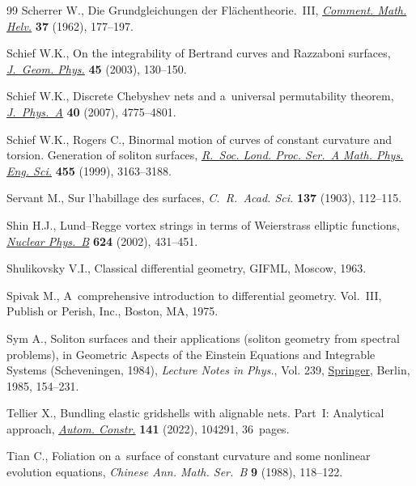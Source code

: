 \documentclass[pdftex]{sigma}
\numberwithin{equation}{section}
\begin{document}
\begin{thebibliography}{99}
Scherrer W., Die {G}rundgleichungen der {F}l\"achentheorie.~{III},
  \href{https://doi.org/10.1007/BF02566971}{\textit{Comment. Math. Helv.}} \textbf{37} (1962), 177--197.

Schief W.K., On the integrability of {B}ertrand curves and {R}azzaboni
  surfaces, \href{https://doi.org/10.1016/S0393-0440(02)00130-4}{\textit{J.~Geom. Phys.}} \textbf{45} (2003), 130--150.

Schief W.K., Discrete {C}hebyshev nets and a~universal permutability theorem,
  \href{https://doi.org/10.1088/1751-8113/40/18/007}{\textit{J.~Phys.~A}} \textbf{40} (2007), 4775--4801.

Schief W.K., Rogers C., Binormal motion of curves of constant curvature and
  torsion. {G}eneration of soliton surfaces, \href{https://doi.org/10.1098/rspa.1999.0445}{\textit{R.~Soc. Lond. Proc. Ser.~A
  Math. Phys. Eng. Sci.}} \textbf{455} (1999), 3163--3188.

Servant M., Sur l'habillage des surfaces, \textit{C.~R.~Acad. Sci.}
  \textbf{137} (1903), 112--115.

Shin H.J., Lund--{R}egge vortex strings in terms of {W}eierstrass elliptic
  functions, \href{https://doi.org/10.1016/S0550-3213(01)00645-9}{\textit{Nuclear Phys.~B}} \textbf{624} (2002), 431--451.

Shulikovsky V.I., Classical differential geometry, GIFML, Moscow, 1963.

Spivak M., A~comprehensive introduction to differential geometry. {V}ol.~{III},
  Publish or Perish, Inc., Boston, MA, 1975.

Sym A., Soliton surfaces and their applications (soliton geometry from spectral
  problems), in Geometric Aspects of the {E}instein Equations and Integrable
  Systems ({S}cheveningen, 1984), \textit{Lecture Notes in Phys.}, Vol. 239,
  \href{https://doi.org/10.1007/3-540-16039-6_6}{Springer}, Berlin, 1985, 154--231.

Tellier X., Bundling elastic gridshells with alignable nets. Part~{I}:
  {A}nalytical approach, \href{https://doi.org/10.1016/j.autcon.2022.104291}{\textit{Autom. Constr.}} \textbf{141} (2022), 104291,
  36~pages.

Tian C., Foliation on a~surface of constant curvature and some nonlinear
  evolution equations, \textit{Chinese Ann. Math. Ser.~B} \textbf{9} (1988),
  118--122.


\end{thebibliography}
\end{document}
